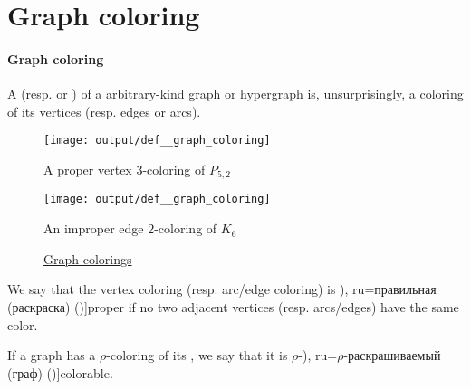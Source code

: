 \section{Graph coloring}\label{sec:graph_coloring}

\paragraph{Graph coloring}

\begin{definition}\label{def:graph_coloring}
  A  (resp.  or ) of a \hyperref[rem:arbitrary_kind_graph]{arbitrary-kind graph or hypergraph} is, unsurprisingly, a \hyperref[def:set_coloring]{coloring} of its vertices (resp. edges or arcs).

  \begin{figure}[!ht]
    \begin{subcaptionblock}{0.5\textwidth}
      \centering
      \texttt{[image: output/def\_\_graph\_coloring]}
      \caption{A proper vertex \( 3 \)-coloring of \hyperref[def:petersen_graph]{\( P_{5,2} \)}}\label{fig:def:graph_coloring/petersen}
    \end{subcaptionblock}
    \hfill
    \begin{subcaptionblock}{0.5\textwidth}
      \centering
      \texttt{[image: output/def\_\_graph\_coloring]}
      \caption{An improper edge \( 2 \)-coloring of \hyperref[def:complete_graph]{\( K_6 \)}}\label{fig:def:graph_coloring/triangle}
    \end{subcaptionblock}
    \caption{\hyperref[def:graph_coloring]{Graph colorings}}\label{fig:def:graph_coloring}
  \end{figure}

  \begin{thmenum}
     We say that the vertex coloring (resp. arc/edge coloring) is \term[bg=правилно (оцветяване) (\cite[141]{Мирчев2001Графи}), ru=правильная (раскраска) (\cite[306]{ЕмеличевИПр1990ТеорияГрафов})]{proper} if no two adjacent vertices (resp. arcs/edges) have the same color.

     If a graph has a \( \rho \)-coloring of its , we say that it is \( \rho \)-\term[bg=\( \rho \)-оцветим (граф) (\cite[141]{Мирчев2001Графи}), ru=\( \rho \)-раскрашиваемый (граф) (\cite[\S 53]{ЕмеличевИПр1990ТеорияГрафов})]{colorable}.
  \end{thmenum}
\end{definition}
